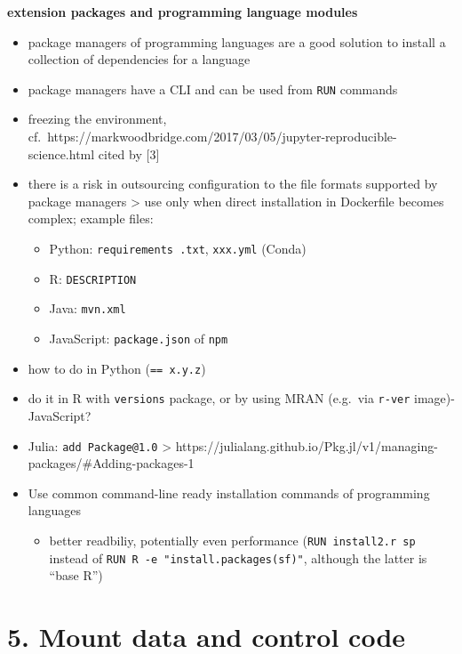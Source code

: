 \documentclass[10pt,letterpaper]{article}
\providecommand{\tightlist}{%
  \setlength{\itemsep}{0pt}\setlength{\parskip}{0pt}}
\begin{document}
\textbf{extension packages and programming language modules}

\begin{itemize}
\tightlist
\item
  package managers of programming languages are a good solution to
  install a collection of dependencies for a language
\item
  package managers have a CLI and can be used from \texttt{RUN} commands
\item
  freezing the environment,
  cf.~https://markwoodbridge.com/2017/03/05/jupyter-reproducible-science.html
  cited by {[}3{]}
\item
  there is a risk in outsourcing configuration to the file formats
  supported by package managers \textgreater{} use only when direct
  installation in Dockerfile becomes complex; example files:

  \begin{itemize}
  \tightlist
  \item
    Python: \texttt{requirements\ .txt}, \texttt{xxx.yml} (Conda)
  \item
    R: \texttt{DESCRIPTION}
  \item
    Java: \texttt{mvn.xml}
  \item
    JavaScript: \texttt{package.json} of \texttt{npm}
  \end{itemize}
\item
  how to do in Python (\texttt{==\ x.y.z})
\item
  do it in R with \texttt{versions} package, or by using MRAN (e.g.~via
  \texttt{r-ver} image)- JavaScript?
\item
  Julia: \texttt{add\ Package@1.0} \textgreater{}
  https://julialang.github.io/Pkg.jl/v1/managing-packages/\#Adding-packages-1
\item
  Use common command-line ready installation commands of programming
  languages

  \begin{itemize}
  \tightlist
  \item
    better readbiliy, potentially even performance
    (\texttt{RUN\ install2.r\ sp} instead of
    \texttt{RUN\ R\ -e\ "install.packages(\textquotesingle{}sf\textquotesingle{})"},
    although the latter is ``base R'')
  \end{itemize}
\end{itemize}

\hypertarget{mount-data-and-control-code}{%
\section*{5. Mount data and control
code}\label{mount-data-and-control-code}}
\end{document}

